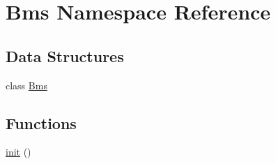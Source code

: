 \hypertarget{namespace_bms}{}\section{Bms Namespace Reference}
\label{namespace_bms}
\subsection*{Data Structures}
\begin{DoxyCompactItemize}
\item 
class \hyperlink{class_bms_1_1_bms}{Bms}
\end{DoxyCompactItemize}
\subsection*{Functions}
\begin{DoxyCompactItemize}
\item 
\hyperlink{namespace_bms_a72bf47280fcd5e7b7521cecc39ffe509}{init} ()
\end{DoxyCompactItemize}
